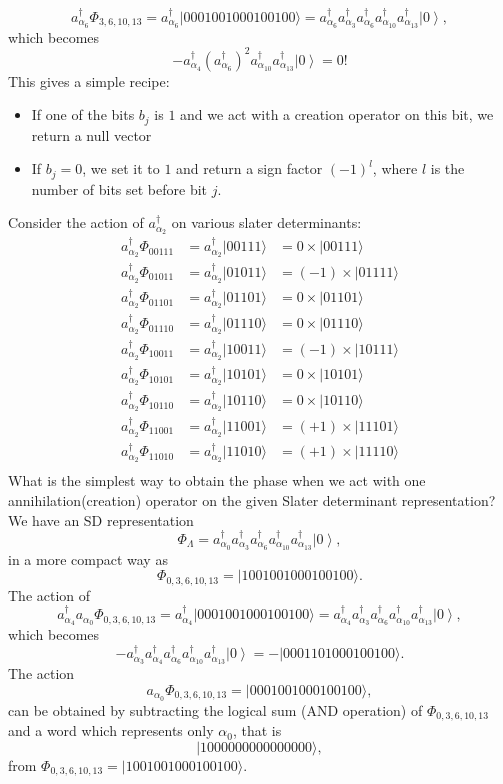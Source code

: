 \documentclass[prc]{revtex4}
\newcommand{\ket}[1]{\left| #1 \right\rangle}
\begin{document}
\[
a^\dagger_{\alpha_6}\Phi_{3,6,10,13} = a^\dagger_{\alpha_6}|0001001000100100\rangle=a^\dagger_{\alpha_6}a_{\alpha_3}^\dagger a_{\alpha_6}^\dagger a_{\alpha_{10}}^\dagger a_{\alpha_{13}}^\dagger \ket{0},
\]
which becomes
\[
-a^\dagger_{\alpha_4} (a_{\alpha_6}^\dagger)^ 2 a_{\alpha_{10}}^\dagger a_{\alpha_{13}}^\dagger \ket{0}=0!
\]
This gives a simple recipe:  
\begin{itemize}
\item If one of the bits $b_j$ is $1$ and we act with a creation operator on this bit, we return a null vector
\item  If $b_j=0$, we set it to $1$ and return a sign factor $(-1)^l$, where $l$ is the number of bits set before bit $j$.
\end{itemize}
Consider the action of $a^\dagger_{\alpha_2}$ on various slater determinants:
\[
\begin{array}{ccc}
a^\dagger_{\alpha_2}\Phi_{00111}& = a^\dagger_{\alpha_2}|00111\rangle&=0\times |00111\rangle\\
a^\dagger_{\alpha_2}\Phi_{01011}& = a^\dagger_{\alpha_2}|01011\rangle&=(-1)\times |01111\rangle\\
a^\dagger_{\alpha_2}\Phi_{01101}& = a^\dagger_{\alpha_2}|01101\rangle&=0\times |01101\rangle\\
a^\dagger_{\alpha_2}\Phi_{01110}& = a^\dagger_{\alpha_2}|01110\rangle&=0\times |01110\rangle\\
a^\dagger_{\alpha_2}\Phi_{10011}& = a^\dagger_{\alpha_2}|10011\rangle&=(-1)\times |10111\rangle\\
a^\dagger_{\alpha_2}\Phi_{10101}& = a^\dagger_{\alpha_2}|10101\rangle&=0\times |10101\rangle\\
a^\dagger_{\alpha_2}\Phi_{10110}& = a^\dagger_{\alpha_2}|10110\rangle&=0\times |10110\rangle\\
a^\dagger_{\alpha_2}\Phi_{11001}& = a^\dagger_{\alpha_2}|11001\rangle&=(+1)\times |11101\rangle\\
a^\dagger_{\alpha_2}\Phi_{11010}& = a^\dagger_{\alpha_2}|11010\rangle&=(+1)\times |11110\rangle\\
\end{array}
\]
What is the simplest way to obtain the phase when we act with one annihilation(creation) operator
on the given Slater determinant representation?
We have an SD representation
\[
\Phi_{\Lambda} = a_{\alpha_0}^\dagger a_{\alpha_3}^\dagger a_{\alpha_6}^\dagger a_{\alpha_{10}}^\dagger a_{\alpha_{13}}^\dagger \ket{0},
\]
in a more compact way as 
\[
\Phi_{0,3,6,10,13} = |1001001000100100\rangle.
\]
The action of 
\[
a^\dagger_{\alpha_4}a_{\alpha_0}\Phi_{0,3,6,10,13} = a^\dagger_{\alpha_4}|0001001000100100\rangle=a^\dagger_{\alpha_4}a_{\alpha_3}^\dagger a_{\alpha_6}^\dagger a_{\alpha_{10}}^\dagger a_{\alpha_{13}}^\dagger \ket{0},
\]
which becomes
\[
-a_{\alpha_3}^\dagger a^\dagger_{\alpha_4} a_{\alpha_6}^\dagger a_{\alpha_{10}}^\dagger a_{\alpha_{13}}^\dagger \ket{0}=-|0001101000100100\rangle.
\]
The action
\[
a_{\alpha_0}\Phi_{0,3,6,10,13} = |0001001000100100\rangle,
\]
can be obtained by subtracting the logical sum (AND operation) of $\Phi_{0,3,6,10,13}$ and 
a word which represents only $\alpha_0$, that is
\[
|1000000000000000\rangle,
\]  
from $\Phi_{0,3,6,10,13}= |1001001000100100\rangle$.
\end{document}
